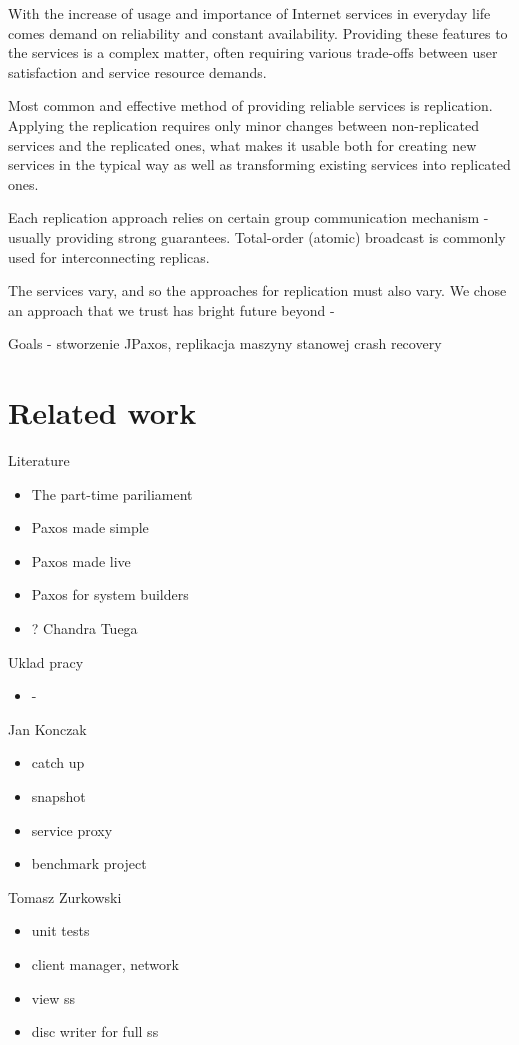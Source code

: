 
With the increase of usage and importance of Internet services in everyday life comes demand on reliability and constant availability.
Providing these features to the services is a complex matter, often requiring various trade-offs between user satisfaction and service resource demands.

Most common and effective method of providing reliable services is replication. Applying the replication requires only minor changes between non-replicated services and the replicated ones, what makes it usable both for creating new services in the typical way %
as well as transforming existing services into replicated ones.

Each replication approach relies on certain group communication mechanism - usually providing strong guarantees. Total-order (atomic) broadcast is commonly used for interconnecting replicas.


The services vary, and so the approaches for replication must also vary. We chose an approach that we trust has bright future beyond - 

Goals
- stworzenie JPaxos, replikacja maszyny stanowej crash recovery

\section{Related work}
Literature

\begin{itemize}
  \item The part-time pariliament
  \item Paxos made simple
  \item Paxos made live
  \item Paxos for system builders
  \item ? Chandra Tuega
\end{itemize}

Uklad pracy

\begin{itemize}
  \item -
\end{itemize}

Jan Konczak 

\begin{itemize}
  \item catch up 
  \item snapshot 
  \item service proxy
  \item benchmark project
\end{itemize}

Tomasz Zurkowski

\begin{itemize}
  \item unit tests
  \item client manager, network
  \item view ss
  \item disc writer for full ss
\end{itemize}
